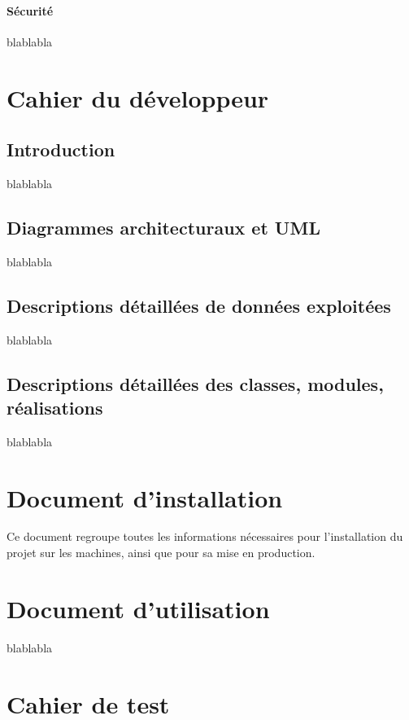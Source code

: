 \documentclass{polytech/polytech}
\numberwithin{figure}{chapter}
\begin{document}
\begin{appendix}
\subsubsection{Sécurité}
blablabla


\chapter{Cahier du développeur}

\section{Introduction}

blablabla

\section{Diagrammes architecturaux et UML}

blablabla

\section{Descriptions détaillées de données exploitées}

blablabla

\section{Descriptions détaillées des classes, modules, réalisations}

blablabla


\chapter{Document d’installation}

Ce document regroupe toutes les informations nécessaires
pour l’installation du projet sur les machines,
ainsi que pour sa mise en production.

\chapter{Document d’utilisation}

blablabla

\chapter{Cahier de test}


\end{appendix}
\end{document}
